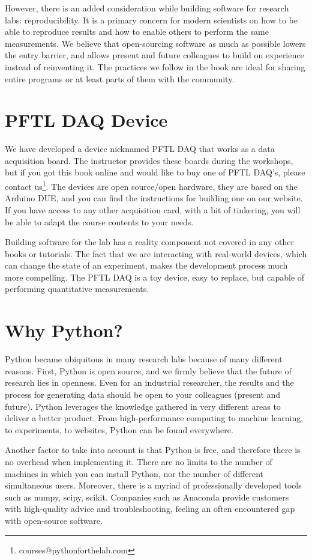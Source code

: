 However, there is an added consideration while building software for research labs: reproducibility. It is a primary concern for modern scientists on how to be able to reproduce results and how to enable others to perform the same measurements. We believe that open-sourcing software as much as possible lowers the entry barrier, and allows present and future colleagues to build on experience instead of reinventing it. The practices we follow in the book are ideal for sharing entire programs or at least parts of them with the community.

\section{PFTL DAQ Device}
We have developed a device nicknamed {PFTL DAQ} that works as a data acquisition board. The instructor provides these boards during the workshops, but if you got this book online and would like to buy one of PFTL DAQ's, please contact us\footnote{courses@pythonforthelab.com}. The devices are open source/open hardware, they are based on the Arduino DUE, and you can find the instructions for building one on our website. If you have access to any other acquisition card, with a bit of tinkering, you will be able to adapt the course contents to your needs.

Building software for the lab has a reality component not covered in any other books or tutorials. The fact that we are interacting with real-world devices, which can change the state of an experiment, makes the development process much more compelling. The PFTL DAQ is a toy device, easy to replace, but capable of performing quantitative measurements.

\section{Why Python?}
Python became ubiquitous in many research labs because of many different reasons. First, Python is open source, and we firmly believe that the future of research lies in openness. Even for an industrial researcher, the results and the process for generating data should be open to your colleagues (present and future). Python leverages the knowledge gathered in very different areas to deliver a better product. From high-performance computing to machine learning, to experiments, to websites, Python can be found everywhere.

Another factor to take into account is that Python is free, and therefore there is no overhead when implementing it. There are no limits to the number of machines in which you can install Python, nor the number of different simultaneous users. Moreover, there is a myriad of professionally developed tools such as numpy, scipy, scikit. Companies such as Anaconda provide customers with high-quality advice and troubleshooting, feeling an often encountered gap with open-source software.

